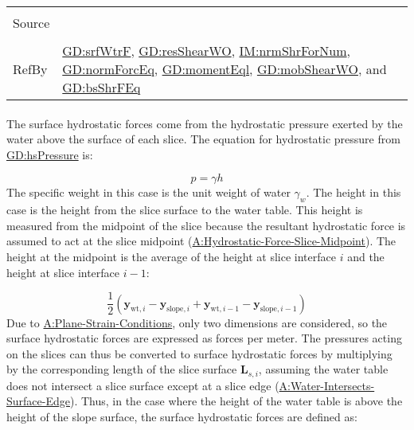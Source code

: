 \documentclass[12pt]{article}
\begin{document}
\begin{minipage}{\textwidth}
\begin{tabular}{>{\raggedright}p{}>{\raggedright\arraybackslash}p{}}
\\ \midrule \\
Source & \cite{fredlund1977}
         
\\ \midrule \\
RefBy & \hyperref[GD:srfWtrF]{GD:srfWtrF}, \hyperref[GD:resShearWO]{GD:resShearWO}, \hyperref[IM:nrmShrForNum]{IM:nrmShrForNum}, \hyperref[GD:normForcEq]{GD:normForcEq}, \hyperref[GD:momentEql]{GD:momentEql}, \hyperref[GD:mobShearWO]{GD:mobShearWO}, and \hyperref[GD:bsShrFEq]{GD:bsShrFEq}
        
\\ \bottomrule
\end{tabular}
\end{minipage}
\paragraph{}
\label{GD:srfWtrFDeriv}
The surface hydrostatic forces come from the hydrostatic pressure exerted by the water above the surface of each slice. The equation for hydrostatic pressure from \hyperref[GD:hsPressure]{GD:hsPressure} is:

\begin{displaymath}
p=γ h
\end{displaymath}
The specific weight in this case is the unit weight of water ${γ_{w}}$. The height in this case is the height from the slice surface to the water table. This height is measured from the midpoint of the slice because the resultant hydrostatic force is assumed to act at the slice midpoint (\hyperref[assumpHFSM]{A:Hydrostatic-Force-Slice-Midpoint}). The height at the midpoint is the average of the height at slice interface $i$ and the height at slice interface $i-1$:

\begin{displaymath}
\frac{1}{2} \left({\symbf{y}_{\text{wt},i}}-{\symbf{y}_{\text{slope},i}}+{\symbf{y}_{\text{wt},i-1}}-{\symbf{y}_{\text{slope},i-1}}\right)
\end{displaymath}
Due to \hyperref[assumpPSC]{A:Plane-Strain-Conditions}, only two dimensions are considered, so the surface hydrostatic forces are expressed as forces per meter. The pressures acting on the slices can thus be converted to surface hydrostatic forces by multiplying by the corresponding length of the slice surface ${\symbf{L}_{s,i}}$, assuming the water table does not intersect a slice surface except at a slice edge (\hyperref[assumpWISE]{A:Water-Intersects-Surface-Edge}). Thus, in the case where the height of the water table is above the height of the slope surface, the surface hydrostatic forces are defined as:
\end{document}
